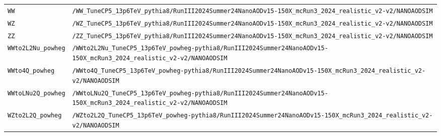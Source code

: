 \begin{longtable}{@{}>{\RaggedRight\arraybackslash}p{} >{\RaggedRight\arraybackslash}p{}@{}}
\addlinespace[2pt]
\texttt{WW} & \texttt{/\allowbreak{}WW\_\allowbreak{}TuneCP5\_\allowbreak{}13p6TeV\_\allowbreak{}pythia8/\allowbreak{}RunIII2024Summer24NanoAODv15-\allowbreak{}150X\_\allowbreak{}mcRun3\_\allowbreak{}2024\_\allowbreak{}realistic\_\allowbreak{}v2-\allowbreak{}v2/\allowbreak{}NANOAODSIM} \\
\addlinespace[2pt]
\texttt{WZ} & \texttt{/\allowbreak{}WZ\_\allowbreak{}TuneCP5\_\allowbreak{}13p6TeV\_\allowbreak{}pythia8/\allowbreak{}RunIII2024Summer24NanoAODv15-\allowbreak{}150X\_\allowbreak{}mcRun3\_\allowbreak{}2024\_\allowbreak{}realistic\_\allowbreak{}v2-\allowbreak{}v2/\allowbreak{}NANOAODSIM} \\
\addlinespace[2pt]
\texttt{ZZ} & \texttt{/\allowbreak{}ZZ\_\allowbreak{}TuneCP5\_\allowbreak{}13p6TeV\_\allowbreak{}pythia8/\allowbreak{}RunIII2024Summer24NanoAODv15-\allowbreak{}150X\_\allowbreak{}mcRun3\_\allowbreak{}2024\_\allowbreak{}realistic\_\allowbreak{}v2-\allowbreak{}v2/\allowbreak{}NANOAODSIM} \\
\addlinespace[2pt]
\texttt{WWto2L2Nu\_\allowbreak{}powheg} & \texttt{/\allowbreak{}WWto2L2Nu\_\allowbreak{}TuneCP5\_\allowbreak{}13p6TeV\_\allowbreak{}powheg-\allowbreak{}pythia8/\allowbreak{}RunIII2024Summer24NanoAODv15-\allowbreak{}150X\_\allowbreak{}mcRun3\_\allowbreak{}2024\_\allowbreak{}realistic\_\allowbreak{}v2-\allowbreak{}v2/\allowbreak{}NANOAODSIM} \\
\addlinespace[2pt]
\texttt{WWto4Q\_\allowbreak{}powheg} & \texttt{/\allowbreak{}WWto4Q\_\allowbreak{}TuneCP5\_\allowbreak{}13p6TeV\_\allowbreak{}powheg-\allowbreak{}pythia8/\allowbreak{}RunIII2024Summer24NanoAODv15-\allowbreak{}150X\_\allowbreak{}mcRun3\_\allowbreak{}2024\_\allowbreak{}realistic\_\allowbreak{}v2-\allowbreak{}v2/\allowbreak{}NANOAODSIM} \\
\addlinespace[2pt]
\texttt{WWtoLNu2Q\_\allowbreak{}powheg} & \texttt{/\allowbreak{}WWtoLNu2Q\_\allowbreak{}TuneCP5\_\allowbreak{}13p6TeV\_\allowbreak{}powheg-\allowbreak{}pythia8/\allowbreak{}RunIII2024Summer24NanoAODv15-\allowbreak{}150X\_\allowbreak{}mcRun3\_\allowbreak{}2024\_\allowbreak{}realistic\_\allowbreak{}v2-\allowbreak{}v2/\allowbreak{}NANOAODSIM} \\
\addlinespace[2pt]
\texttt{WZto2L2Q\_\allowbreak{}powheg} & \texttt{/\allowbreak{}WZto2L2Q\_\allowbreak{}TuneCP5\_\allowbreak{}13p6TeV\_\allowbreak{}powheg-\allowbreak{}pythia8/\allowbreak{}RunIII2024Summer24NanoAODv15-\allowbreak{}150X\_\allowbreak{}mcRun3\_\allowbreak{}2024\_\allowbreak{}realistic\_\allowbreak{}v2-\allowbreak{}v2/\allowbreak{}NANOAODSIM} \\

\end{longtable}
